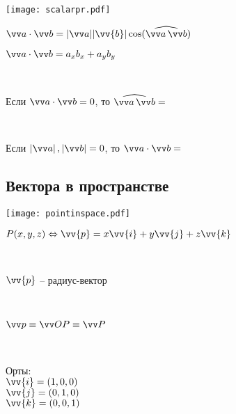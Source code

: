 \documentclass[10pt]{beamer}
\begin{document}
    {
    	{
    		
			\texttt{[image: scalarpr.pdf]}
    		
    		
    	}
    	{
    		$\VV{a} \cdot \VV{b} = |\VV{a}||\vv{b}|\cos(\widehat{\VV{a} \, \VV{b}})$ 
    		
    		\hfill
    		
    		$\VV{a} \cdot \VV{b} = a_xb_x + a_yb_y $
    		
    		~
    		
    		\pause Если $\VV{a} \cdot \VV{b} = 0$, то $\widehat{\VV{a} \, \VV{b}} =$ 
    		
    		~
    		
    		\pause Если $\ABS{\VV{a}},\ABS{\VV{b}} = 0$, то  $\VV{a} \cdot \VV{b} =$ 		
    	
    	
    		
    	}
    	
    
    	
    }
	
	


\subsection{Вектора в пространстве}

{
	{
		
		\texttt{[image: pointinspace.pdf]}
		
	}
	{
		$P(x,y,z) \Leftrightarrow \vv{p}=x\vv{i} + y\vv{j} + z\vv{k} $
		
		~
		
		$\vv{p}$ -- радиус-вектор	
		
		~
		
		$\VV p \equiv \VV {OP} \equiv \VV P$
		
		~
		
		Орты:\\
		$\vv{i}=(1,0,0)$\\
		$\vv{j}=(0,1,0)$\\
		$\vv{k}=(0,0,1)$
		 
		
		
	}
}
\end{document}
